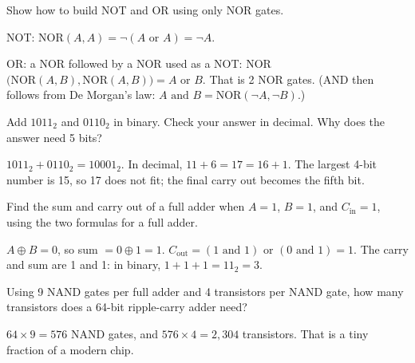 \begin{Exercise}[title={NOR Is Universal Too}, label=dl_noruniv]
Show how to build NOT and OR using only NOR gates.
\end{Exercise}
\begin{Answer}[ref=dl_noruniv]
NOT: NOR$(A, A) = \neg(A \text{ or } A) = \neg A$.

OR: a NOR followed by a NOR used as a NOT: NOR$\big(\text{NOR}(A,B), \text{NOR}(A,B)\big) = A \text{ or } B$.
That is 2 NOR gates. (AND then follows from De Morgan's law: $A \text{ and } B = \text{NOR}(\neg A, \neg B)$.)
\end{Answer}

\begin{Exercise}[title={Add by Hand}, label=dl_add]
Add $1011_2$ and $0110_2$ in binary. Check your answer in decimal. Why does the answer need 5 bits?
\end{Exercise}
\begin{Answer}[ref=dl_add]
$1011_2 + 0110_2 = 10001_2$. In decimal, $11 + 6 = 17 = 16 + 1$. The largest 4-bit number is 15, so 17
does not fit; the final carry out becomes the fifth bit.
\end{Answer}

\begin{Exercise}[title={Trace a Full Adder}, label=dl_trace]
Find the sum and carry out of a full adder when $A = 1$, $B = 1$, and $C_{\text{in}} = 1$, using the two
formulas for a full adder.
\end{Exercise}
\begin{Answer}[ref=dl_trace]
$A \oplus B = 0$, so sum $= 0 \oplus 1 = 1$. $C_{\text{out}} = (1 \text{ and } 1) \text{ or } (0 \text{ and } 1)
= 1$. The carry and sum are 1 and 1: in binary, $1 + 1 + 1 = 11_2 = 3$.
\end{Answer}

\begin{Exercise}[title={Counting Transistors}, label=dl_count]
Using 9 NAND gates per full adder and 4 transistors per NAND gate, how many transistors does a 64-bit
ripple-carry adder need?
\end{Exercise}
\begin{Answer}[ref=dl_count]
$64 \times 9 = 576$ NAND gates, and $576 \times 4 = 2{,}304$ transistors. That is a tiny fraction of a modern
chip.
\end{Answer}


